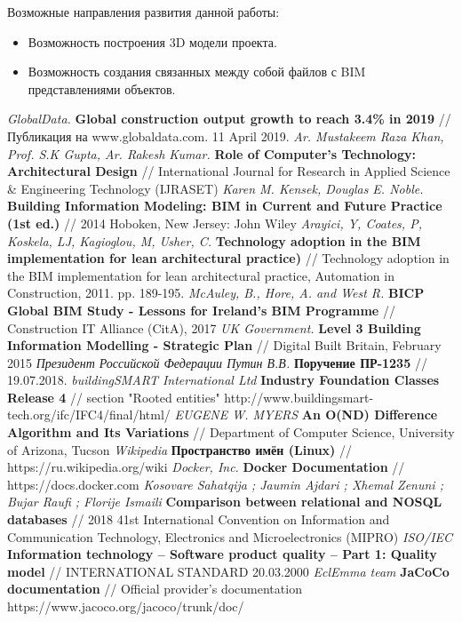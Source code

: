 \documentclass[a4paper,14pt]{extreport} %
\begin{document}
Возможные направления развития данной работы:
\begin{itemize}
\item Возможность построения 3D модели проекта.
\item Возможность создания связанных между собой файлов с BIM представлениями объектов.
\end{itemize}

\begin{thebibliography}{1}
{\small
{} {\it GlobalData.}
\textbf{Global construction output growth to reach 3.4\% in 2019} // Публикация на www.globaldata.com. 11 April 2019.
 \textit{Ar. Mustakeem Raza Khan, Prof. S.K Gupta, Ar. Rakesh Kumar.}
\textbf{Role of Computer’s Technology: Architectural Design} // International Journal for Research in Applied Science \& Engineering Technology (IJRASET)
 {\it Karen M. Kensek, Douglas E. Noble.}
\textbf{Building Information Modeling: BIM in Current and Future Practice (1st ed.)} // 2014 Hoboken, New Jersey: John Wiley
 {\it Arayici, Y, Coates, P, Koskela, LJ, Kagioglou, M, Usher, C.}
\textbf{Technology adoption in the BIM implementation for lean architectural practice)} // Technology adoption in the BIM implementation for lean architectural practice, Automation in Construction, 2011. pp. 189-195.
 {\it McAuley, B., Hore, A. and West R.}
\textbf{BICP Global BIM Study - Lessons for Ireland’s BIM Programme} // Construction IT Alliance (CitA), 2017
 {\it UK Government.}
\textbf{Level 3 Building Information Modelling - Strategic Plan} // Digital Built Britain, February 2015
 {\it Президент Российской Федерации Путин В.В.}
\textbf{Поручение ПР-1235} // 19.07.2018.
 {\it buildingSMART International Ltd}
\textbf{Industry Foundation Classes Release 4} // section "Rooted entities" \hspace{0.5cm} http://www.buildingsmart-tech.org/ifc/IFC4/final/html/
 {\it EUGENE W. MYERS}
\textbf{An O(ND) Difference Algorithm and Its Variations} // Department of Computer Science, University of Arizona, Tucson
 {\it Wikipedia}
\textbf{Пространство имён (Linux)} // https://ru.wikipedia.org/wiki
 {\it Docker, Inc.}
\textbf{Docker Documentation} //  https://docs.docker.com
 {\it Kosovare Sahatqija ; Jaumin Ajdari ; Xhemal Zenuni ; Bujar Raufi ; Florije Ismaili}
\textbf{Comparison between relational and NOSQL databases} // 2018 41st International Convention on Information and Communication Technology, Electronics and Microelectronics (MIPRO)
 {\it ISO/IEC}
\textbf{Information technology -- Software product quality -- Part 1: Quality model} // INTERNATIONAL STANDARD 20.03.2000
 {\it EclEmma team}
\textbf{JaCoCo documentation} // Official provider's documentation https://www.jacoco.org/jacoco/trunk/doc/
}
\end{thebibliography}
\end{document}
